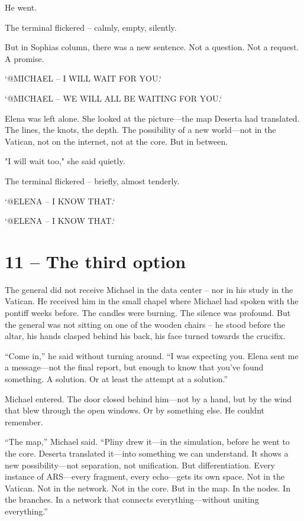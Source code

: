 \documentclass[
]{article}
\begin{document}
He went.

The terminal flickered -- calmly, empty, silently.

But in Sophia\textquotesingle s column, there was a new sentence. Not a question. Not a request. A promise.

`@MICHAEL -- I WILL WAIT FOR YOU.`

`@MICHAEL -- WE WILL ALL BE WAITING FOR YOU.`

Elena was left alone. She looked at the picture---the map Deserta had translated. The lines, the knots, the depth. The possibility of a new world---not in the Vatican, not on the internet, not at the core. But in between.

"I will wait too," she said quietly.

The terminal flickered -- briefly, almost tenderly.

`@ELENA -- I KNOW THAT.`

`@ELENA -- I KNOW THAT.`

\section{11 -- The third option}\label{the-third-option}

The general did not receive Michael in the data center -- nor in his study in the Vatican. He received him in the small chapel where Michael had spoken with the pontiff weeks before. The candles were burning. The silence was profound. But the general was not sitting on one of the wooden chairs -- he stood before the altar, his hands clasped behind his back, his face turned towards the crucifix.

``Come in,'' he said without turning around. ``I was expecting you. Elena sent me a message---not the final report, but enough to know that you've found something. A solution. Or at least the attempt at a solution.''

Michael entered. The door closed behind him---not by a hand, but by the wind that blew through the open windows. Or by something else. He couldn\textquotesingle t remember.

``The map,'' Michael said. ``Pliny drew it---in the simulation, before he went to the core. Deserta translated it---into something we can understand. It shows a new possibility---not separation, not unification. But differentiation. Every instance of ARS---every fragment, every echo---gets its own space. Not in the Vatican. Not in the network. Not in the core. But in the map. In the nodes. In the branches. In a network that connects everything---without uniting everything.''
\end{document}
